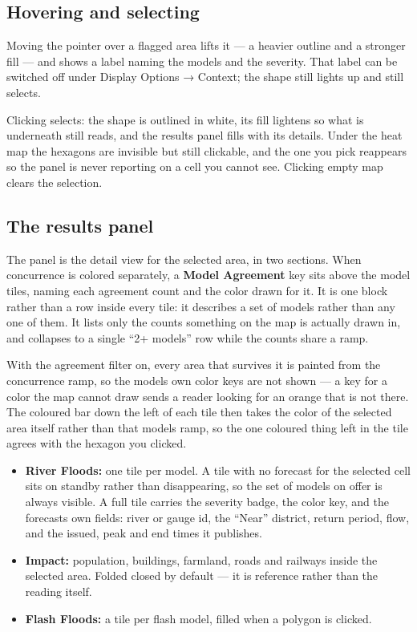 \subsection{Hovering and selecting}\label{hovering-and-selecting}

Moving the pointer over a flagged area lifts it --- a heavier outline and a stronger fill --- and shows a label naming the models and the severity.
That label can be switched off under Display Options → Context; the shape still lights up and still selects.

Clicking selects: the shape is outlined in white, its fill lightens so what is underneath still reads, and the results panel fills with its details.
Under the heat map the hexagons are invisible but still clickable, and the one you pick reappears so the panel is never reporting on a cell you cannot see.
Clicking empty map clears the selection.

\subsection{The results panel}\label{the-results-panel}

The panel is the detail view for the selected area, in two sections.
When concurrence is colored separately, a \textbf{Model Agreement} key sits above the model tiles, naming each agreement count and the color drawn for it.
It is one block rather than a row inside every tile: it describes a set of models rather than any one of them.
It lists only the counts something on the map is actually drawn in, and collapses to a single ``2+ models'' row while the counts share a ramp.

With the agreement filter on, every area that survives it is painted from the concurrence ramp, so the models\textquotesingle{} own color keys are not shown --- a key for a color the map cannot draw sends a reader looking for an orange that is not there.
The coloured bar down the left of each tile then takes the color of the selected area itself rather than that model\textquotesingle s ramp, so the one coloured thing left in the tile agrees with the hexagon you clicked.

\begin{itemize}
\item
  \textbf{River Floods:} one tile per model. A tile with no forecast for the selected cell sits on standby rather than disappearing, so the set of models on offer is always visible. A full tile carries the severity badge, the color key, and the forecast\textquotesingle s own fields: river or gauge id, the ``Near'' district, return period, flow, and the issued, peak and end times it publishes.
\item
  \textbf{Impact:} population, buildings, farmland, roads and railways inside the selected area. Folded closed by default --- it is reference rather than the reading itself.
\item
  \textbf{Flash Floods:} a tile per flash model, filled when a polygon is clicked.
\end{itemize}

